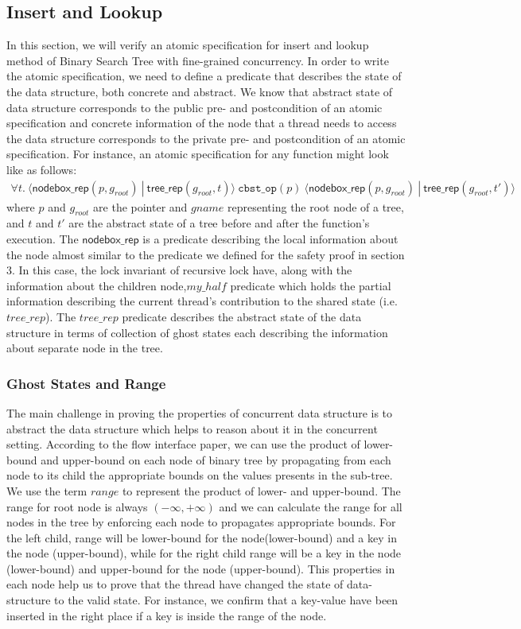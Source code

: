 \documentclass[acmsmall,screen]{acmart}\settopmatter{printfolios=true}
\begin{document}
\subsection{Insert and Lookup}
In this section, we will verify an atomic specification for insert and lookup method of Binary Search Tree with fine-grained concurrency. In order to write the atomic specification, we need to define a predicate that describes the state of the data structure, both concrete and abstract. We know that abstract state of data structure corresponds to the public pre- and postcondition of an atomic specification and concrete information of the node that a thread needs to access the data structure corresponds to the private pre- and postcondition of an atomic specification. For instance, an atomic specification for any function might look like as follows:
\begin{align*}\forall t.\ \langle \mathsf{nodebox\_rep}(p,g_{\mathit{root}})\ |\ \mathsf{tree\_rep}(g_{\mathit{root}}, t)\rangle\ \texttt{cbst\_op}(p)\ \langle \mathsf{nodebox\_rep}(p,g_{\mathit{root}})\ |\ \mathsf{tree\_rep}(g_{\mathit{root}}, t')\rangle
\end{align*}
where $p$ and $g_{\mathit{root}}$ are the pointer and $gname$ representing the root node of a tree, and $t$ and $t'$ are the abstract state of a tree before and after the function's execution. The $\mathsf{nodebox\_rep}$ is a predicate describing the local information about the node almost similar to the predicate we defined for the safety proof in section 3. In this case, the lock invariant of recursive lock have, along with the information about the children node,$\mathit{my\_half}$ predicate which holds the partial information describing the current thread's contribution to the shared state (i.e. $\mathit{tree\_rep}$). The $\mathit{tree\_rep}$ predicate describes the abstract state of the data structure in terms of collection of ghost states each describing the information about separate node in the tree.
\subsubsection{Ghost States and Range}
The main challenge in proving the properties of concurrent data structure is to abstract the data structure which helps to reason about it in the concurrent setting. According to the flow interface paper, we can use the product of lower-bound and upper-bound on each node of binary tree by propagating from each node to its child the appropriate bounds on the values presents in the sub-tree. We use the term $range$ to represent the product of lower- and upper-bound. The range for root node is always $(-\infty,+\infty)$ and we can calculate the range for all nodes in the tree by enforcing each node to propagates appropriate bounds. For the left child, range will be lower-bound for the node(lower-bound) and a key in the node (upper-bound), while for the right child range will be a key in the node (lower-bound) and upper-bound for the node (upper-bound). This properties in each node help us to prove that the thread have changed the state of data-structure to the valid state. For instance, we confirm that a key-value have been inserted in the right place if a key is inside the range of the node.
\end{document}
